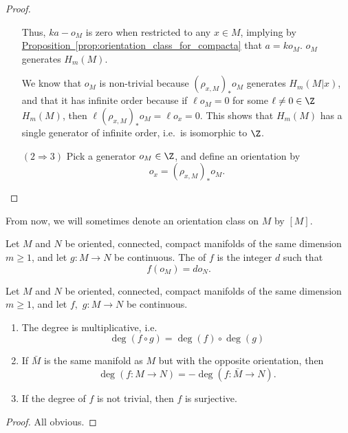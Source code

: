 \documentclass[main.tex]{subfiles}
\begin{document}
\begin{proof}
\begin{enumerate}[leftmargin=4em]
      Thus, \(ka - o_{M}\) is zero when restricted to any \(x \in M\), implying by \hyperref[prop:orientation_class_for_compacta]{Proposition~\ref*{prop:orientation_class_for_compacta}} that \(a = k o_{M}\). \(o_{M}\) generates \(H_{m}(M)\).

      We know that \(o_{M}\) is non-trivial because \((\rho_{x, M})_{*} o_{M}\) generates \(H_{m}(M | x)\), and that it has infinite order because if \(\ell o_{M} = 0\) for some \(\ell \neq 0 \in \Z\) \(H_{m}(M)\), then \(\ell (\rho_{x, M})_{*}o_{M} = \ell o_{x} = 0\). This shows that \(H_{m}(M)\) has a single generator of infinite order, i.e.\ is isomorphic to \(\Z\).


    \item[\((2 \Rightarrow 3)\)] Pick a generator \(o_{M} \in \Z\), and define an orientation by
      \begin{equation*}
        o_{x} = (\rho_{x, M})_{*} o_{M}.
      \end{equation*}
  \end{enumerate}
\end{proof}

From now, we will sometimes denote an orientation class on \(M\) by \([M]\).

\begin{definition}[degree]
  \label{def:degree}
  Let \(M\) and \(N\) be oriented, connected, compact manifolds of the same dimension \(m \geq 1\), and let \(g\colon M \to N\) be continuous. The  of \(f\) is the integer \(d\) such that
  \begin{equation*}
    f(o_{M}) = d o_{N}.
  \end{equation*}
\end{definition}

\begin{proposition}
  Let \(M\) and \(N\) be oriented, connected, compact manifolds of the same dimension \(m \geq 1\), and let \(f,\) \(g\colon M \to N\) be continuous.
  \begin{enumerate}
    \item The degree is multiplicative, i.e.
      \begin{equation*}
        \deg(f \circ g) = \deg(f) \circ \deg(g)
      \end{equation*}

    \item If \(\bar{M}\) is the same manifold as \(M\) but with the opposite orientation, then
      \begin{equation*}
        \deg (f\colon M \to N) = - \deg(f\colon \bar{M} \to N).
      \end{equation*}

    \item If the degree of \(f\) is not trivial, then \(f\) is surjective.
  \end{enumerate}
\end{proposition}
\begin{proof}
  All obvious.
\end{proof}
\end{document}
